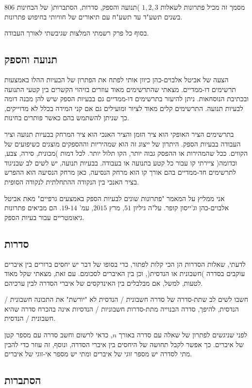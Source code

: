 מסמך זה מכיל פתרונות לשאלות  
$1,2,3$
)תנועה והספק, סדרות, הסתברות( של הבחינות 
$806$
בשנים תשע"ד עד תשע"ח עם תיאורים של חוויותי בחיפוש פתרונות.

בסוף כל פרק רשמתי המלצות שגיבשתי לאורך העבודה.
\subsection*{תנועה והספק}

הצעה של אביטל אלבוים-כהן כיוון אותי לפתח את הפתרון של הבעיות ההלו באמצעות תרשימים דו-ממדיים. מצאתי שהתרשימים מאוד עוזרים בזיהוי הקשרים בין קטעי התנועה ובכתיבת הנוסחאות. ניתן להיעזר בתרשימים דו-ממדיים גם בבעיות הספק שיש להן מבנה דומה לבעיות תנועה. התרשימים קלים מאוד לציור ומועילים גם אם קני המידה בכלל לא מדוייקים, כך שניתן להשתמש בהם כאשר פותרים בחינות.


בתרשימים הציר האופקי הוא ציר הזמן והציר האנכי הוא ציר המרחק בבעיות תנועה וציר העבודה בבעיות הספק. היתרון של ייצוג זה הוא שמהיריות וההספקים מוצגים כשיפועים של הקווים. ככל שהמהירות או ההפסק גבוה יותר, הקו תלול יותר. לכל דמות )מכונית, סירה, צבע, וכדומה( ציירתי קו עבור כל קטע בתנועה או בעבודה. בבעיות תנועה, יש לשים לב שבניגוד לתרשימים חד-ממדיים בהם אורך קו הוא מרחק הנסיעה, כאן מרחק הנסיעה הוא ההפרש בציר האנכי בין הנקודה ההתחלתית לנקודה הסופית.

אני ממליץ על המאמר "פתרונות שונים לבעיות הספק באמצעים גרפיים" מאת אביטל אלבוים-כהן וג'ייסון קופר. על"ה גיליון
$51$,
מרץ
$2015$,
עמ'
$14$-$19$.
הם מביאים פתרונות גיאומטריים עבור בעיות הספק.

\subsection*{סדרות}

לדעתי, שאלות הסדרות הן הכי קלות לפתור, כדי בסופו של דבר יש יחסים ברורים בין איברים עוקבים בסדרה )חשבונית או הנדסית(, וכן בין האיברים לסכומם. עם זאת, מצאתי שקל מאוד לטעות, למשל, אם מבלבלים בין האינדקסים של איברי הסדרה לבין ערכיהם.

חשבו לשים לב שתת-סדרה של סדרה חשבונית / הנדסית לא "יורשת" את התכונה חשבונית / הנדסית, להיפך, סדרה הבנוייה מתת-סדרות חשבוניות / הנדסיות אינה בהכרח סדרה שהיא חשבונית / הנדסית.

לפני שניגשים לפתרון של שאלה עם סדרה באורך
$n$,
כדאי לרשום וחשב סדרה עם מספר קטן של איברים. כך אפשר לקבל תחושה של היחסים בין איברי הסדרה, ונוסף, זה עוזר כדי להבין מתי לסדרה יש מספר זוגי של איברים ומתי יש מספר אי-זוגי של איברים.


\subsection*{הסתברות}

